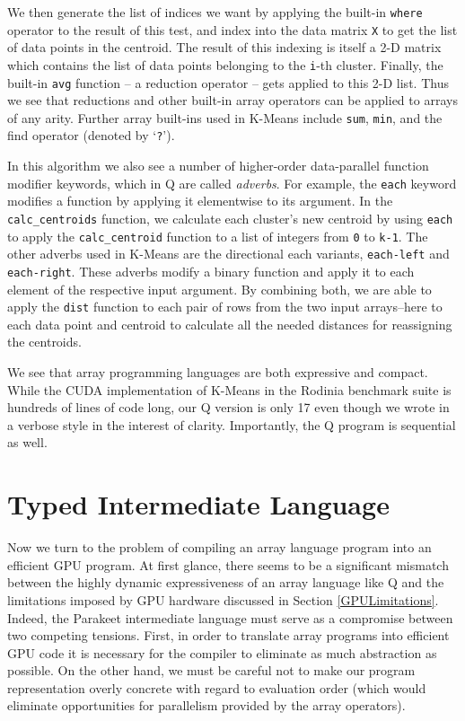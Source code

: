 \documentclass[preprint]{sigplanconf}
\begin{document}
We then generate the list of indices we want by applying the built-in \texttt{where} operator to the result of this test, and index into the data matrix \texttt{X} to get the list of data points in the centroid. The result of this indexing is itself a 2-D matrix which contains the list of data points belonging to the \texttt{i}-th cluster. Finally, the built-in \texttt{avg} function -- a reduction operator -- gets applied to this 2-D list. Thus we see that reductions and other built-in array operators can be applied to arrays of any arity.  Further array built-ins used in K-Means include \texttt{sum}, \texttt{min}, and the find operator (denoted by `\texttt{?}').

In this algorithm we also see a number of higher-order data-parallel function modifier keywords, which in Q are called \emph{adverbs}.  For example, the \texttt{each} keyword modifies a function by applying it elementwise to its argument.  In the \texttt{calc\_centroids} function, we calculate each cluster's
new centroid by using \texttt{each} to apply the \texttt{calc\_centroid} function to a list of integers from \texttt{0} to \texttt{k-1}.  The other adverbs used in K-Means are the directional each variants, \texttt{each-left} and \texttt{each-right}. These adverbs modify a binary function and apply it to each element of the respective input argument.  By combining both, we are able to apply the \texttt{dist} function to each pair of rows from the two input arrays--here to each data point and centroid to calculate all the needed distances for reassigning the centroids.

We see that array programming languages are both expressive and compact.  While the CUDA implementation of K-Means in the Rodinia benchmark suite is hundreds of lines of code long, our Q version is only 17 even though we wrote in a verbose style in the interest of clarity. Importantly, the Q program is sequential as well.

\section{Typed Intermediate Language}
Now we turn to the problem of compiling an array language program into an efficient GPU program. At first glance, there seems to be a significant mismatch between the highly dynamic expressiveness of an array language like Q and the limitations imposed by GPU hardware discussed in Section \ref{GPULimitations}. Indeed, the Parakeet intermediate language must serve as a compromise between two competing tensions. First, in order to translate array programs into efficient GPU code it is necessary for the compiler to eliminate as much abstraction as possible. On the other hand, we must be careful not to make our program representation overly concrete with regard to evaluation order (which would eliminate opportunities for parallelism provided by the array operators).
\end{document}
